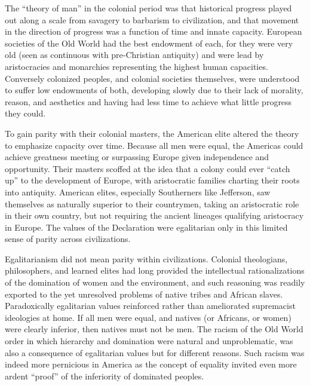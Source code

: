 \documentclass[]{book}
\begin{document}
The ``theory of man'' in the colonial period was that historical
progress played out along a scale from savagery to barbarism to
civilization, and that movement in the direction of progress was a
function of time and innate capacity. European societies of the Old
World had the best endowment of each, for they were very old (seen as
continuous with pre-Christian antiquity) and were lead by aristocracies
and monarchies representing the highest human capacities. Conversely
colonized peoples, and colonial societies themselves, were understood to
suffer low endowments of both, developing slowly due to their lack of
morality, reason, and aesthetics and having had less time to achieve
what little progress they could.

To gain parity with their colonial masters, the American elite altered
the theory to emphasize capacity over time. Because all men were equal,
the Americas could achieve greatness meeting or surpassing Europe given
independence and opportunity. Their masters scoffed at the idea that a
colony could ever ``catch up'' to the development of Europe, with
aristocratic families charting their roots into antiquity. American
elites, especially Southerners like Jefferson, saw themselves as
naturally superior to their countrymen, taking an aristocratic role in
their own country, but not requiring the ancient lineages qualifying
aristocracy in Europe. The values of the Declaration were egalitarian
only in this limited sense of parity across civilizations.

Egalitarianism did not mean parity within civilizations. Colonial
theologians, philosophers, and learned elites had long provided the
intellectual rationalizations of the domination of women and the
environment, and such reasoning was readily exported to the yet
unresolved problems of native tribes and African slaves. Paradoxically
egalitarian values reinforced rather than ameliorated supremacist
ideologies at home. If all men were equal, and natives (or Africans, or
women) were clearly inferior, then natives must not be men. The racism
of the Old World order in which hierarchy and domination were natural
and unproblematic, was also a consequence of egalitarian values but for
different reasons. Such racism was indeed more pernicious in America as
the concept of equality invited even more ardent ``proof'' of the
inferiority of dominated peoples.
\end{document}
